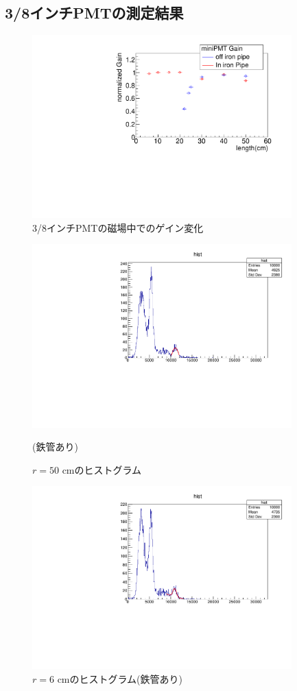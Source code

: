 \subsection{3/8インチPMTの測定結果}
\begin{figure}[H]
	\centering
		\includegraphics[angle=-90,width=10cm]{fig/iguchi/miniPMTgainG.pdf}
	\caption{3/8インチPMTの磁場中でのゲイン変化}
	\label{miniPMTgainG}
\end{figure}

\begin{figure}[H]
	\centering
		\includegraphics[angle=-90,width=10cm]{fig/iguchi/minicoin22.pdf}
	\caption{$r=50$ cmのヒストグラム}(鉄管あり)
	\label{histminicoin22}
\end{figure}

\begin{figure}[H]
	\centering
		\includegraphics[angle=-90,width=10cm]{fig/iguchi/minicoin21.pdf}
	\caption{$r=6$ cmのヒストグラム(鉄管あり)}
	\label{histminicoin21}
\end{figure}

